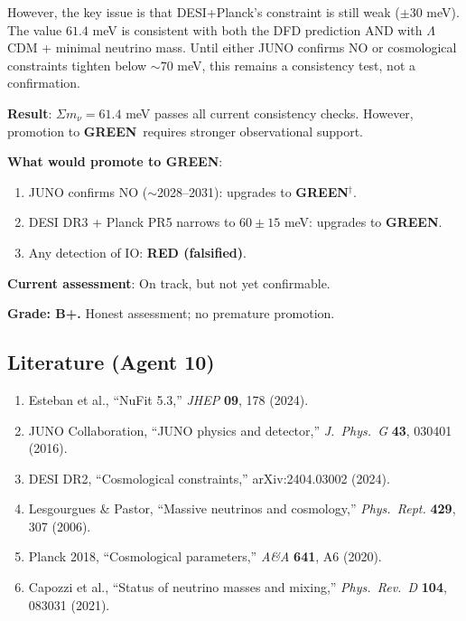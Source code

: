 \documentclass[11pt,a4paper]{article}
\newcommand{\GREEN}{\textcolor{dfdgreen}{\textbf{GREEN}}}
\newcommand{\YELLOW}{\textcolor{dfdyellow}{\textbf{YELLOW}}}
\begin{document}
However, the key issue is that DESI+Planck's constraint is still weak ($\pm 30$ meV). The value $61.4$ meV is consistent with both the DFD prediction AND with $\Lambda$CDM + minimal neutrino mass. Until either JUNO confirms NO or cosmological constraints tighten below $\sim 70$ meV, this remains a consistency test, not a confirmation.

\begin{tcolorbox}[colback=yellow!5!white, colframe=yellow!60!black, title={Agent 10: $\Sigma m_\nu$ --- REMAINS \YELLOW}]
\textbf{Result}: $\Sigma m_\nu = 61.4$ meV passes all current consistency checks. However, promotion to \GREEN\ requires stronger observational support.

\textbf{What would promote to GREEN}:
\begin{enumerate}
\item JUNO confirms NO ($\sim$2028--2031): upgrades to \GREEN$^\dagger$.
\item DESI DR3 + Planck PR5 narrows to $60 \pm 15$ meV: upgrades to \GREEN.
\item Any detection of IO: \textbf{RED (falsified)}.
\end{enumerate}

\textbf{Current assessment}: On track, but not yet confirmable.

\textbf{Grade: B+.} Honest assessment; no premature promotion.
\end{tcolorbox}

\subsection{Literature (Agent 10)}

\begin{enumerate}
\item Esteban et al., ``NuFit 5.3,'' \textit{JHEP} \textbf{09}, 178 (2024).
\item JUNO Collaboration, ``JUNO physics and detector,'' \textit{J.\ Phys.\ G} \textbf{43}, 030401 (2016).
\item DESI DR2, ``Cosmological constraints,'' arXiv:2404.03002 (2024).
\item Lesgourgues \& Pastor, ``Massive neutrinos and cosmology,'' \textit{Phys.\ Rept.} \textbf{429}, 307 (2006).
\item Planck 2018, ``Cosmological parameters,'' \textit{A\&A} \textbf{641}, A6 (2020).
\item Capozzi et al., ``Status of neutrino masses and mixing,'' \textit{Phys.\ Rev.\ D} \textbf{104}, 083031 (2021).
\end{enumerate}
\end{document}
